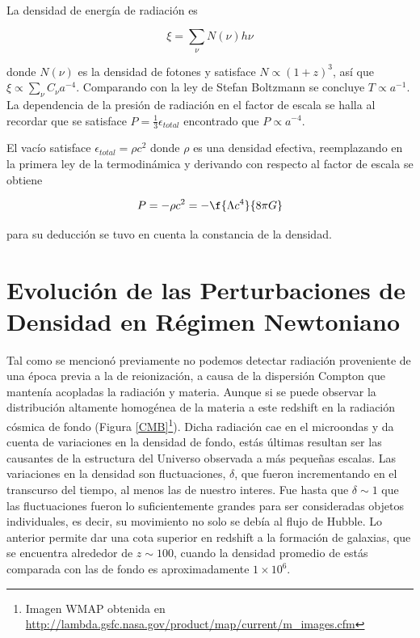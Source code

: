 \

La densidad de energía de radiación es

\[\xi=\sum_{\nu}N(\nu)h\nu\]

donde $N(\nu)$ es la densidad de fotones y satisface $N \propto (1+z)^3$,
así que $\xi \propto  \sum_\nu C_\nu a^{-4} $. Comparando con la ley 
de Stefan Boltzmann se concluye $T\propto a^{-1}$.
La dependencia de la presión de radiación en el factor de escala
se halla al recordar que se satisface $ P=\frac{1}{3}\epsilon_{total}$
encontrado que $P \propto a^{-4}$. 

El vacío satisface $\epsilon_{total}=\rho c^2$ donde $\rho$ es una densidad 
efectiva, reemplazando en la primera ley de la termodinámica y derivando 
con respecto al factor de escala se obtiene 

\[ P=-\rho c^2 = -\f{ \Lambda c^4}{8\pi G}\]

para su deducción se tuvo en cuenta la constancia de la densidad.  


\section{Evolución de las Perturbaciones de Densidad en Régimen Newtoniano}

Tal como se mencionó previamente no podemos detectar radiación proveniente 
de una época previa a la de reionización, a causa de la dispersión Compton
que mantenía acopladas la radiación y materia.
Aunque si se puede observar la distribución altamente homogénea de la materia
a este redshift en la radiación cósmica de fondo (Figura \ref{CMB}\footnote{
Imagen WMAP obtenida en \url{http://lambda.gsfc.nasa.gov/product/map/current/m_images.cfm}}).  
Dicha radiación cae en el microondas y da cuenta de variaciones 
en la densidad de fondo, estás últimas resultan ser las causantes de 
la estructura del Universo observada a más pequeñas escalas.
Las variaciones en la densidad son fluctuaciones, $\delta$, que fueron 
incrementando en el transcurso del tiempo, al menos las de nuestro
interes. 
Fue hasta que $\delta\sim 1$  que las fluctuaciones fueron lo 
suficientemente grandes para ser consideradas objetos indi\-vi\-dua\-les, es decir,
su movimiento no solo se debía al flujo de Hubble. 
Lo anterior permite dar una cota superior en redshift a la formación de galaxias, 
que se encuentra alrededor de $z\sim 100$, cuando la densidad promedio de estás 
comparada con las de fondo es aproximadamente $1\times 10^6$. 

